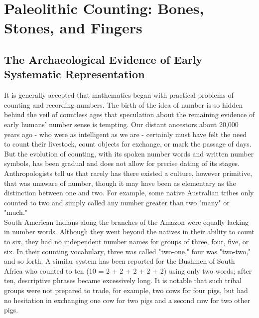 \documentclass[12pt, oneside, openany]{book}
\begin{document}
\section{Paleolithic Counting: Bones, Stones, and Fingers}
\subsection{The Archaeological Evidence of Early Systematic Representation}

It is generally accepted that mathematics began with practical problems of counting and recording numbers. The birth of the idea of number is so hidden behind the veil of countless ages that speculation about the remaining evidence of early humans' number sense is tempting. Our distant ancestors about 20,000 years ago - who were as intelligent as we are - certainly must have felt the need to count their livestock, count objects for exchange, or mark the passage of days. But the evolution of counting, with its spoken number words and written number symbols, has been gradual and does not allow for precise dating of its stages.\\
Anthropologists tell us that rarely has there existed a culture, however primitive, that was unaware of number, though it may have been as elementary as the distinction between one and two. For example, some native Australian tribes only counted to two and simply called any number greater than two "many" or "much."\\
South American Indians along the branches of the Amazon were equally lacking in number words. Although they went beyond the natives in their ability to count to six, they had no independent number names for groups of three, four, five, or six. In their counting vocabulary, three was called "two-one," four was "two-two," and so forth. A similar system has been reported for the Bushmen of South Africa who counted to ten (10 = 2 + 2 + 2 + 2 + 2) using only two words; after ten, descriptive phrases became excessively long. It is notable that such tribal groups were not prepared to trade, for example, two cows for four pigs, but had no hesitation in exchanging one cow for two pigs and a second cow for two other pigs.
\end{document}

